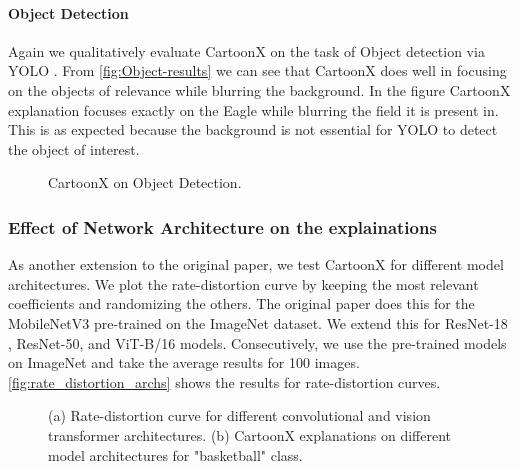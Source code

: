 \paragraph{Object Detection}
Again we qualitatively evaluate CartoonX on the task of Object detection via YOLO \cite{redmon2016you}. From \autoref{fig:Object-results} we can see that CartoonX does well in focusing on the objects of relevance while blurring the background. In the figure CartoonX explanation focuses exactly on the Eagle while blurring the field it is present in. This is as expected because the background is not essential for YOLO to detect the object of interest. 

\begin{figure}[H]

\centering
{}\hfil   
{}\hfil
{}
\caption{CartoonX on Object Detection.}\label{fig:Object-results}
\end{figure}






\subsubsection{Effect of Network Architecture on the explainations}
As another extension to the original paper, we test CartoonX for different model architectures. We plot the rate-distortion curve by keeping the most relevant coefficients and randomizing the others. The original paper does this for the MobileNetV3 pre-trained on the ImageNet dataset. We extend this for ResNet-18 \cite{he2016deep}, ResNet-50\cite{he2016deep}, and ViT-B/16\cite{dosovitskiy2020image} models. Consecutively, we use the pre-trained models on ImageNet and take the average results for 100 images. \autoref{fig:rate_distortion_archs} shows the results for rate-distortion curves.


\begin{figure}[H]
    \centering
    \hfil
    \hfil
    
    \caption{(a) Rate-distortion curve for different convolutional and vision transformer architectures. (b) CartoonX explanations on different model architectures for "basketball" class.}
    \label{fig:rate_distortion_archs}
\end{figure}

